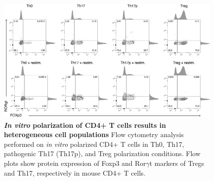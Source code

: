 \begin{figure}
    \centering
    \includegraphics[width=\textwidth]{Figures/FOXp3_vs_RORgt.png}
    \caption{\textbf{\textit{In vitro} polarization of CD4+ T cells results in heterogeneous cell populations} Flow cytometry analysis performed on \textit{in vitro} polarized CD4+ T cells in Th0, Th17, pathogenic Th17 (Th17p), and Treg polarization conditions. Flow plots show protein expression of Foxp3 and Ror$\gamma$t \textemdash markers of Tregs and Th17, respectively \textemdash  in mouse CD4+ T cells.}
    \label{fig:CD4flow}
\end{figure}



